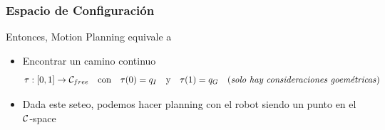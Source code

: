 \begin{frame}
\begin{itemize}
    \end{itemize}
    
\end{frame}

%    
%    

\begin{frame}
    \frametitle{Espacio de Configuración}
    
    Entonces, Motion Planning equivale a 
    
    \begin{itemize}
        \item Encontrar un camino continuo
        \begin{equation*}
            \tau : [0,1] \rightarrow \mathcal{C}_{free} \quad \text{con} \quad \tau(0) = q_{I} \quad \text{y} \quad  \tau(1) = q_{G} \quad \text{(\emph{solo hay consideraciones goemétricas})}
        \end{equation*} 
        \item Dada este seteo, podemos hacer planning con el robot siendo un punto en el $\mathcal{C}$-space
    \end{itemize}

    \vspace{3em}


\end{frame}

